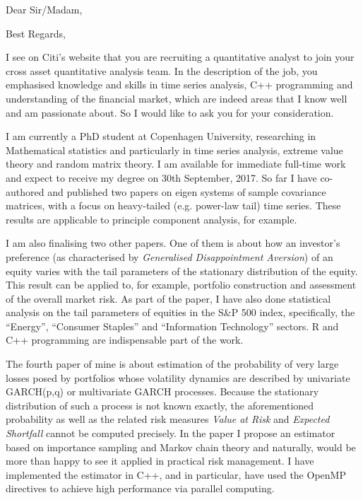 \documentclass[10pt,a4paper, gentium]{moderncv}        %
\begin{document}
\date{\today}
\opening{Dear Sir/Madam,}
\closing{Best Regards,}
\makelettertitle

I see on Citi's website that you are recruiting a quantitative
analyst to join your cross asset quantitative analysis team. In the
description of the job, you emphasised knowledge and skills in time
series analysis, C++ programming and understanding of the financial
market, which are indeed areas that I know well and am passionate
about. So I would like to ask you for your consideration.

I am currently a PhD student at Copenhagen University, researching in
Mathematical statistics and particularly in time series analysis,
extreme value theory and random matrix theory. I am available for
immediate full-time work and expect to receive my degree on 30th
September, 2017. So far I have co-authored and published two papers on
eigen systems of sample covariance matrices, with a focus on
heavy-tailed (e.g. power-law tail) time series. These results are
applicable to principle component analysis, for example.

I am also finalising two other papers. One of them is about how an
investor's preference (as characterised by {\em Generalised
  Disappointment Aversion}) of an equity varies with the tail
parameters of the stationary distribution of the equity. This
result can be applied to, for example, portfolio construction and
assessment of the overall market risk. As part of the paper, I have
also done statistical analysis on the tail parameters of equities in
the S\&P 500 index, specifically, the ``Energy'', ``Consumer Staples''
and ``Information Technology'' sectors. R and C++ programming are
indispensable part of the work.

The fourth paper of mine is about estimation of the probability of very
large losses posed by portfolios whose volatility dynamics are
described by univariate GARCH(p,q) or multivariate GARCH
processes. Because the stationary distribution of such a process is
not known exactly, the aforementioned probability as well as the
related risk measures {\em Value at Risk} and {\em Expected
  Shortfall} cannot be computed precisely. In the paper I propose 
an estimator based on importance sampling and Markov chain theory and
naturally, would be more than happy to see it applied in practical
risk management. I have implemented the estimator in C++, and in
particular, have used the OpenMP directives to achieve high
performance via parallel computing.
\end{document}
